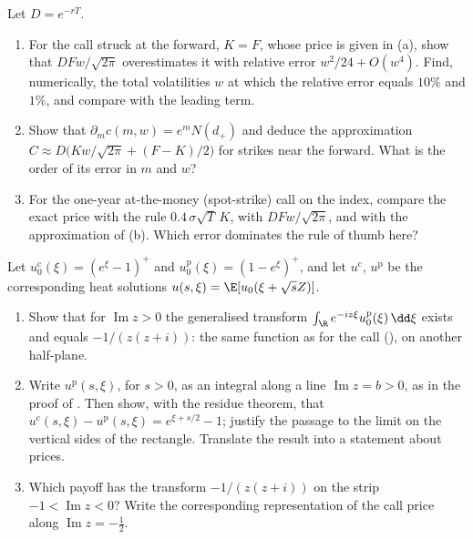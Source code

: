 \begin{exercise}\label{ex:bsf-atm}
\medium Let $D=e^{-rT}$.
\begin{enumerate}[label=(\alph*)]
  \item For the call struck at the forward, $K=F$, whose price is given in (a), show
    that $DFw/\sqrt{2\pi}$ overestimates it with relative error $w^2/24+O(w^4)$. Find, numerically, the total
    volatilities $w$ at which the relative error equals $10\%$ and $1\%$, and compare with the leading term.
  \item Show that $\partial_mc(m,w)=e^mN(d_+)$ and deduce the approximation
    $C\approx D\big(Kw/\sqrt{2\pi}+(F-K)/2\big)$ for strikes near the forward. What is the order of its error
    in $m$ and $w$?
  \item For the one-year at-the-money (spot-strike) call on the index, compare the exact price with the rule
    $0.4\,\sigma\sqrt T\,K$, with $DFw/\sqrt{2\pi}$, and with the approximation of (b). Which error dominates
    the rule of thumb here?
\end{enumerate}
\end{exercise}

\begin{exercise}\label{ex:bsf-residues}
\medium Let $u_0^{\mathrm c}(\xi)=(e^\xi-1)^+$ and $u_0^{\mathrm p}(\xi)=(1-e^\xi)^+$, and let $u^{\mathrm c}$,
$u^{\mathrm p}$ be the corresponding heat solutions $u(s,\xi)=\E[u_0(\xi+\sqrt sZ)]$.
\begin{enumerate}[label=(\alph*)]
  \item Show that for $\operatorname{Im}z>0$ the generalised transform $\int_\R e^{-iz\xi}u_0^{\mathrm p}(\xi)\,\dd\xi$
    exists and equals $-1/(z(z+i))$: the same function as for the call (),
    on another half-plane.
  \item Write $u^{\mathrm p}(s,\xi)$, for $s>0$, as an integral along a line $\operatorname{Im}z=b>0$, as in the
    proof of . Then show, with the residue theorem, that
    $u^{\mathrm c}(s,\xi)-u^{\mathrm p}(s,\xi)=e^{\xi+s/2}-1$; justify the passage to the limit on the vertical
    sides of the rectangle. Translate the result into a statement about prices.
  \item Which payoff has the transform $-1/(z(z+i))$ on the strip $-1<\operatorname{Im}z<0$? Write the
    corresponding representation of the call price along $\operatorname{Im}z=-\frac12$.
\end{enumerate}
\end{exercise}

